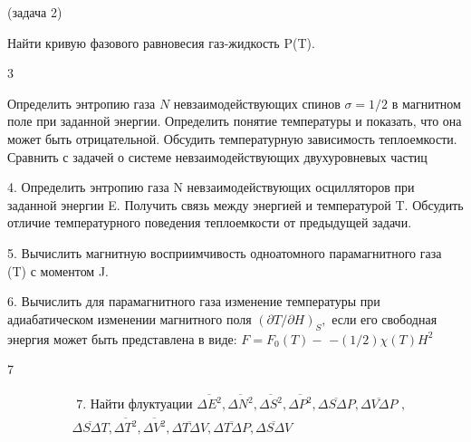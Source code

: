 \documentclass[a4paper,12pt]{article} %
\begin{document}
\begin{task}
(задача 2)

Найти кривую фазового равновесия газ-жидкость P(T).


\end{task}


\begin{task}

3

Определить энтропию газа $ N $ невзаимодействующих спинов  $\sigma= 1/2$ в магнитном поле при заданной энергии. 
Определить понятие температуры и показать, что она может быть отрицательной. 
Обсудить температурную зависимость теплоемкости. 
Сравнить с задачей о системе невзаимодействующих двухуровневых частиц







\end{task}


\begin{task}
4. Определить энтропию газа N невзаимодействующих осцилляторов при заданной энергии E. Получить связь между энергией и температурой T. Обсудить отличие температурного поведения теплоемкости от предыдущей задачи.



\end{task}


\begin{task}

5. Вычислить магнитную восприимчивость одноатомного парамагнитного газа (T) с моментом J.


\end{task}


\begin{task}

$6 .$ Вычислить для парамагнитного газа изменение температуры при адиабатическом изменении магнитного поля $(\partial T / \partial H)_{S},$ если его свободная энергия может быть представлена в виде: $F=F_{0}(T)-$ $-(1 / 2) \chi(T) H^{2}$


\end{task}


\begin{task}

7

$$
\begin{aligned}
&\text { 7. Найти флуктуации } \overline{\Delta E^{2}}, \overline{\Delta N^{2}}, \overline{\Delta S^{2}}, \overline{\Delta P^{2}}, \overline{\Delta S \Delta P}, \overline{\Delta V \Delta P} \text { , }\\
&\overline{\Delta S \Delta T}, \overline{\Delta T^{2}}, \overline{\Delta V^{2}}, \overline{\Delta T \Delta V}, \overline{\Delta T \Delta P}, \overline{\Delta S \Delta V}
\end{aligned}$$


\end{task}
\end{document}
